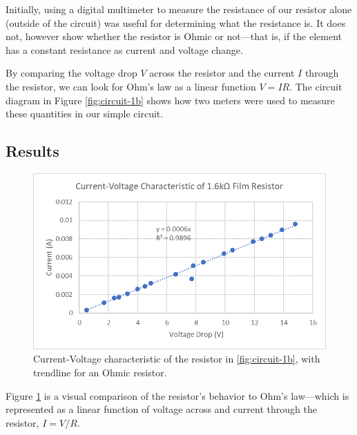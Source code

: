\documentclass[a4paper, 11pt]{article}
\begin{document}
        Initially, using a digital multimeter to measure the resistance of our resistor alone (outside of the circuit) was useful for determining what the resistance is. It does not, however show whether the resistor is Ohmic or not---that is, if the element has a constant resistance as current and voltage change. \
        
        By comparing the voltage drop \( V \) across the resistor and the current \(I \) through the resistor, we can look for Ohm's law as a linear function \( V = IR \). The circuit diagram in Figure \ref{fig:circuit-1b} shows how two meters were used to measure these quantities in our simple circuit.

    \subsection{Results}


        \begin{figure}[H]
            \centering
            \includegraphics{PH425-Lab1-1b-1.png}
            \caption{Current-Voltage characteristic of the resistor in \ref{fig:circuit-1b}, with trendline for an Ohmic resistor.}
            \label{fig:results-1b}
        \end{figure}
        \newpage


        Figure \ref{fig:results-1b} is a visual comparison of the resistor's behavior to Ohm's law---which is represented as a linear function of voltage across and current through the resistor, \( I = V/R \). \
        
\end{document}
